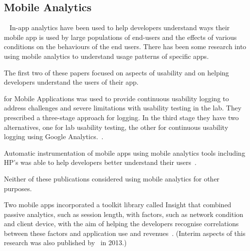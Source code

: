\subsection{Mobile Analytics}~\label{rw-mobile-analytics-topic}
In-app analytics have been used to help developers understand ways their mobile app is used by large populations of end-users and the effects of various conditions on the behaviours of the end users. There has been some research into using mobile analytics to understand usage patterns of specific apps.

The first two of these papers focused on aspects of usability and on helping developers understand the users  of their app.

 for Mobile Applications was used to provide continuous usability logging to address challenges and severe limitations with usability testing in the lab. They prescribed a three-stage approach for logging. In the third stage they have two alternatives, one for lab usability testing, the other for continuous usability logging using Google Analytics.~.

Automatic instrumentation of mobile apps using mobile analytics tools including HP's  was able to help developers better understand their users~.

Neither of these publications considered using mobile analytics for other purposes.

Two mobile apps incorporated a toolkit library called Insight that combined passive analytics, such as session length, with factors, such as network condition and client device, with the aim of helping the developers recognise correlations between these factors and application use and revenues~. (Interim aspects of this research was also published by~ in 2013.)


